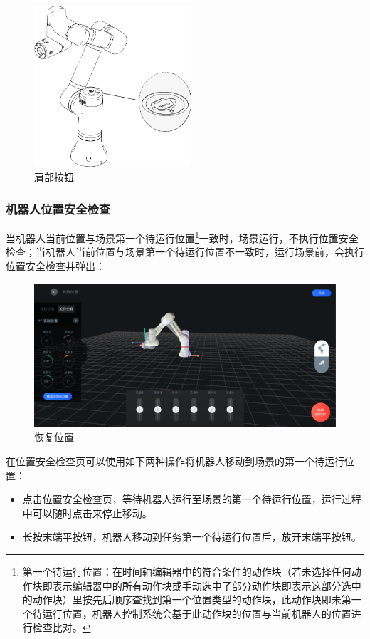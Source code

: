 \begin{figure}[ht]
	\centering
	\includegraphics[height=6cm]{line_graphs/shoulder_btn.pdf}
	\caption{肩部按钮}
	\label{fig:肩部按钮示意图}
\end{figure}

\subsubsection{机器人位置安全检查}
当机器人当前位置与场景第一个待运行位置\footnote{第一个待运行位置：在时间轴编辑器中的符合条件的动作块（若未选择任何动作块即表示编辑器中的所有动作块或手动选中了部分动作块即表示这部分选中的动作块）里按先后顺序查找到第一个位置类型的动作块，此动作块即未第一个待运行位置，机器人控制系统会基于此动作块的位置与当前机器人的位置进行检查比对。}一致时，场景运行，不执行位置安全检查；当机器人当前位置与场景第一个待运行位置不一致时，运行场景前，会执行位置安全检查并弹出：

\begin{figure}[ht]
	\centering
	\includegraphics[width=\textwidth]{shots/position_check.pdf}
	\caption{恢复位置}
	\label{fig:位置安全检查页}
\end{figure}

在位置安全检查页可以使用如下两种操作将机器人移动到场景的第一个待运行位置：
\begin{itemize}
	\item 点击位置安全检查页，等待机器人运行至场景的第一个待运行位置，运行过程中可以随时点击来停止移动。
	\item 长按末端平按钮，机器人移动到任务第一个待运行位置后，放开末端平按钮。
\end{itemize}

